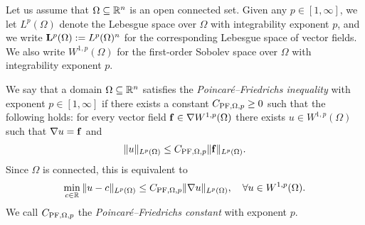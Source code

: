 \documentclass[10pt,letterpaper]{article}
\begin{document}
Let us assume that $\Omega \subseteq {\mathbb R}^{n}$ is an open connected set. 
Given any $p \in [1,\infty]$, we let $L^{p}(\Omega)$ denote the Lebesgue space over $\Omega$ with integrability exponent $p$, and we write ${\mathbf L}^{p}(\Omega) := L^{p}(\Omega)^{n}$ for the corresponding Lebesgue space of vector fields. 
We also write $W^{1,p}(\Omega)$ for the first-order Sobolev space over $\Omega$ with integrability exponent $p$. 


We say that a domain $\Omega \subseteq {\mathbb R}^{n}$ satisfies the \emph{Poincar\'e--Friedrichs inequality} with exponent $p \in [1,\infty]$
if there exists a constant $C_{{\rm PF},\Omega,p} \geq 0$ such that the following holds:
for every vector field ${\mathbf f} \in \nabla W^{1,p}(\Omega)$ there exists $u \in W^{1,p}(\Omega)$
such that $\nabla u = {\mathbf f}$ and 
\begin{align}\label{math:inequalitypf:gradient}
    \| u \|_{L^{p}(\Omega)}
    \leq 
    C_{{\rm PF},\Omega,p} 
    \| {\mathbf f} \|_{L^{p}(\Omega)}
    .
\end{align}
Since $\Omega$ is connected, this is equivalent to  
\begin{align*}
    \min_{ c \in {\mathbb R} } \| u - c \|_{L^{p}(\Omega)}
    \leq 
    C_{{\rm PF},\Omega,p} 
    \| \nabla u \|_{L^{p}(\Omega)},
    \quad 
    \forall 
    u \in W^{1,p}(\Omega)
    .
\end{align*}
We call $C_{{\rm PF},\Omega,p}$ the \emph{Poincar\'e--Friedrichs constant} with exponent $p$. 
\\
\end{document}
